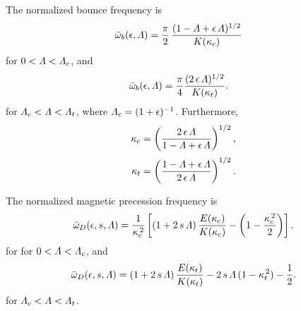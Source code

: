 \documentclass[12pt,prb,aps,notitlepage]{revtex4-1}
\begin{document}
The normalized bounce frequency is 
\begin{align}
\bar{\omega}_b(\epsilon,{\mit\Lambda}) &=\frac{\pi}{2}\,\frac{(1-{\mit\Lambda}+\epsilon\,{\mit\Lambda})^{1/2}}{K(\kappa_c)}
\end{align}
for $0<{\mit\Lambda}< {\mit\Lambda}_c$, and 
\begin{align}
\bar{\omega}_b(\epsilon,{\mit\Lambda}) &=\frac{\pi}{4}\frac{(2\,\epsilon\,{\mit\Lambda})^{1/2}}{K(\kappa_t)}.
\end{align}
for ${\mit\Lambda}_c< {\mit\Lambda} < {\mit\Lambda}_t$, where ${\mit\Lambda}_c= (1+\epsilon)^{-1}$. Furthermore,
\begin{align}
\kappa_c & =\left(\frac{2\,\epsilon\,{\mit\Lambda}}{1-{\mit\Lambda}+\epsilon\,{\mit\Lambda}}\right)^{1/2},\\[0.5ex]
\kappa_t &= \left(\frac{1-{\mit\Lambda}+\epsilon\,{\mit\Lambda}}{2\,\epsilon\,{\mit\Lambda}}\right)^{1/2}.
\end{align}

The normalized magnetic precession frequency is 
\begin{equation}
\bar{\omega}_D(\epsilon,s,{\mit\Lambda}) =\frac{1}{\kappa_c^{\,2}}\left[(1+2\,s\,{\mit\Lambda})\,\frac{E(\kappa_c)}{K(\kappa_c)} - \left(1-\frac{\kappa_c^{\,2}}{2}\right)\right].
\end{equation}
for for $0<{\mit\Lambda}< {\mit\Lambda}_c$, and 
\begin{equation}
\bar{\omega}_D(\epsilon,s,{\mit\Lambda}) =(1+2\,s\,{\mit\Lambda})\,\frac{E(\kappa_t)}{K(\kappa_t)} -2\,s\,{\mit\Lambda}\,(1-\kappa_t^{\,2})-\frac{1}{2}.
\end{equation}
for ${\mit\Lambda}_c< {\mit\Lambda} < {\mit\Lambda}_t$.
\end{document}
